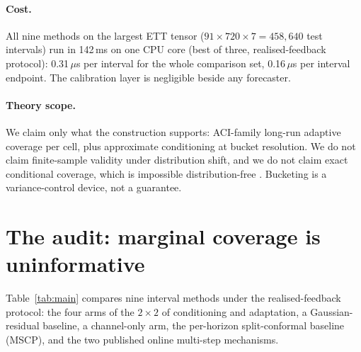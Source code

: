 \documentclass[11pt]{article}
\begin{document}
\paragraph{Cost.} All nine methods on the largest ETT tensor ($91 \times 720 \times 7 = 458{,}640$ test intervals) run in 142\,ms on one CPU core (best of three, realised-feedback protocol): 0.31\,$\mu$s per interval for the whole comparison set, 0.16\,$\mu$s per interval endpoint. The calibration layer is negligible beside any forecaster.

\paragraph{Theory scope.} We claim only what the construction supports: ACI-family long-run adaptive coverage per cell, plus approximate conditioning at bucket resolution. We do not claim finite-sample validity under distribution shift, and we do not claim exact conditional coverage, which is impossible distribution-free \citep{vovk2012,barber2021}. Bucketing is a variance-control device, not a guarantee.

\section{The audit: marginal coverage is uninformative}\label{sec:audit}

Table~\ref{tab:main} compares nine interval methods under the realised-feedback protocol: the four arms of the $2 \times 2$ of conditioning and adaptation, a Gaussian-residual baseline, a channel-only arm, the per-horizon split-conformal baseline (MSCP), and the two published online multi-step mechanisms.
\end{document}
